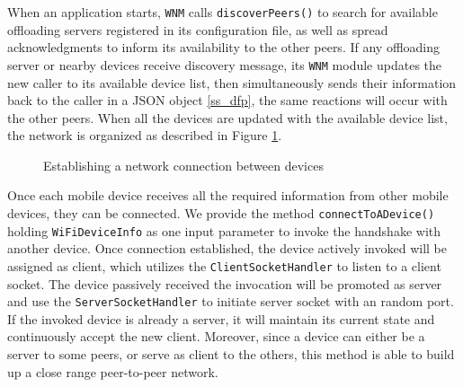 \documentclass[conference]{IEEEtran}
\begin{document}
When an application starts, \texttt{WNM} calls \texttt{discoverPeers()} to search for available offloading servers registered in its configuration file, as well as spread acknowledgments to inform its availability to the other peers. If any offloading server or nearby devices receive discovery message, its \texttt{WNM} module updates the new caller to its available device list, then simultaneously sends their information back to the caller in a JSON object \ref{ss_dfp}, the same reactions will occur with the other peers. When all the devices are updated with the available device list, the network is organized as described in Figure \ref{fig:forming}.

\begin{figure}
	\centering
	\caption{Establishing a network connection between devices}
	\label{fig:forming}
\end{figure}


Once each mobile device receives all the required information from other mobile devices, they can be connected. We provide the method \texttt{connectToADevice()} holding \texttt{WiFiDeviceInfo} as one input parameter to invoke the handshake with another device. Once connection established, the device actively invoked will be assigned as client, which utilizes the \texttt{ClientSocketHandler} to listen to a client socket. The device passively received the invocation will be promoted as server and use the \texttt{ServerSocketHandler} to initiate server socket with an random port. If the invoked device is already a server, it will maintain its current state and continuously accept the new client. Moreover, since a device can either be a server to some peers, or serve as client to the others, this method is able to build up a close range peer-to-peer network.
\end{document}
